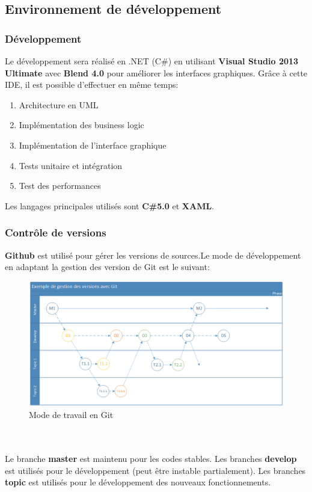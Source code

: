 \documentclass{article}
\begin{document}
\subsection{\Large Environnement de développement}
\vspace{0.2 cm}
\subsubsection{\large Développement}
Le développement sera réalisé en .NET (C\#) en utilisant \textbf{Visual Studio 2013 Ultimate} avec \textbf{Blend 4.0} pour améliorer les interfaces graphiques. Grâce à cette IDE, il est possible d'effectuer en même temps:
\begin{enumerate}
\item Architecture en UML
\item Implémentation des business logic
\item Implémentation de l'interface graphique
\item Tests unitaire et intégration
\item Test des performances
\end{enumerate}
Les langages principales utilisés sont \textbf{C\#5.0} et \textbf{XAML}.

\clearpage
\subsubsection{\large Contrôle de versions}

\textbf{Github} est utilisé pour gérer les versions de sources.Le mode de développement en adaptant la gestion des version de Git est le suivant: 
\begin{figure}[h!]
\centering
\includegraphics[width=150mm]{GIT.png}
\caption{Mode de travail en Git}
\end{figure}
\ \\\\Le branche \textbf{master} est maintenu pour les codes stables.
Les branches  \textbf{develop} est utilisés pour le développement (peut être instable partialement).
Les branches  \textbf{topic} est utilisés pour le développement des nouveaux fonctionnements.
\vspace{0.2 cm}
\end{document}
